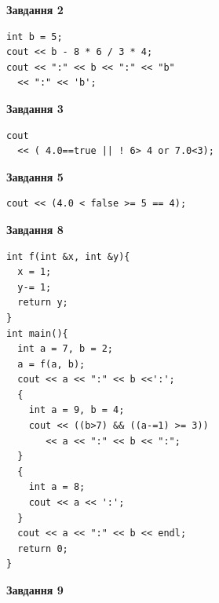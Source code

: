 \documentclass[12pt, ukrainian]{article}
\begin{document}
{\begin {large}
\begin{minipage}[t]{7.0cm}
\end{minipage}
\vline \hspace{1mm}
\begin{minipage}[t]{11.0cm}

\begin{center}
\textbf{Завдання 2}
\end{center}
\vspace{-8mm}

\begin{verbatim}
int b = 5;
cout << b - 8 * 6 / 3 * 4;
cout << ":" << b << ":" << "b" 
  << ":" << 'b';
\end{verbatim}



\begin{center}
\textbf{Завдання 3}
\end{center}
\vspace{-8mm}

\begin{verbatim}
cout 
  << ( 4.0==true || ! 6> 4 or 7.0<3);
\end{verbatim}



\begin{center}
\textbf{Завдання 5}
\end{center}
\vspace{-8mm}

\begin{verbatim}
cout << (4.0 < false >= 5 == 4);
\end{verbatim}



\begin{center}
\textbf{Завдання 8}
\end{center}
\vspace{-8mm}

\begin{verbatim}
int f(int &x, int &y){
  x = 1;
  y-= 1;
  return y;
}
int main(){
  int a = 7, b = 2;
  a = f(a, b);
  cout << a << ":" << b <<':';
  {
    int a = 9, b = 4;
    cout << ((b>7) && ((a-=1) >= 3))
       << a << ":" << b << ":";
  }
  {
    int a = 8;
    cout << a << ':';
  }
  cout << a << ":" << b << endl;
  return 0;
}
\end{verbatim}

\end{minipage}


\begin{minipage}[t]{7.0cm}

\begin{center}
\textbf{Завдання 9}
\end{center}
\vspace{-8mm}


\end{minipage}
\end{large}}
\end{document}
